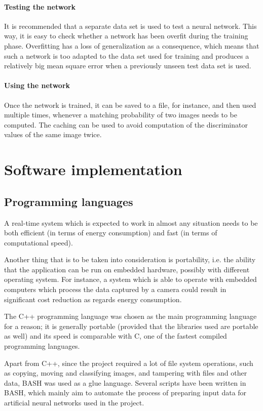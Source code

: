 \documentclass[times, utf8, zavrsni]{fer}
\begin{document}
\subsubsection{Testing the network}
It is recommended that a separate data set is used to test a neural network.
This way, it is easy to check whether a network has been overfit during the
training phase. Overfitting has a loss of generalization as a consequence,
which means that such a network is too adapted to the data set used for training
and produces a relatively big mean square error when a previously unseen test
data set is used.

\subsubsection{Using the network}
Once the network is trained, it can be saved to a file, for instance, and then
used multiple times, whenever a matching probability of two images needs to be
computed. The caching can be used to avoid computation of the discriminator
values of the same image twice.

\chapter{Software implementation}

\section{Programming languages}
A real-time system which is expected to work in almost any situation needs to be
both efficient (in terms of energy consumption) and fast (in terms of
computational speed).
 
Another thing that is to be taken into consideration is portability, i.e. the
ability that the application can be run on embedded hardware, possibly with
different operating system. For instance, a system which is able to operate with
embedded computers which process the data captured by a camera could result in
significant cost reduction as regards energy consumption.

The C++ programming language was chosen as the main programming language for a
reason; it is generally portable (provided that the libraries used are portable
as well) and its speed is comparable with C, one of the fastest compiled
programming languages.

Apart from C++, since the project required a lot of file system operations, such
as copying, moving and classifying images, and tampering with files and other
data, BASH was used as a glue language. Several scripts have been written in
BASH, which mainly aim to automate the process of preparing input data for
artificial neural networks used in the project.
\end{document}
